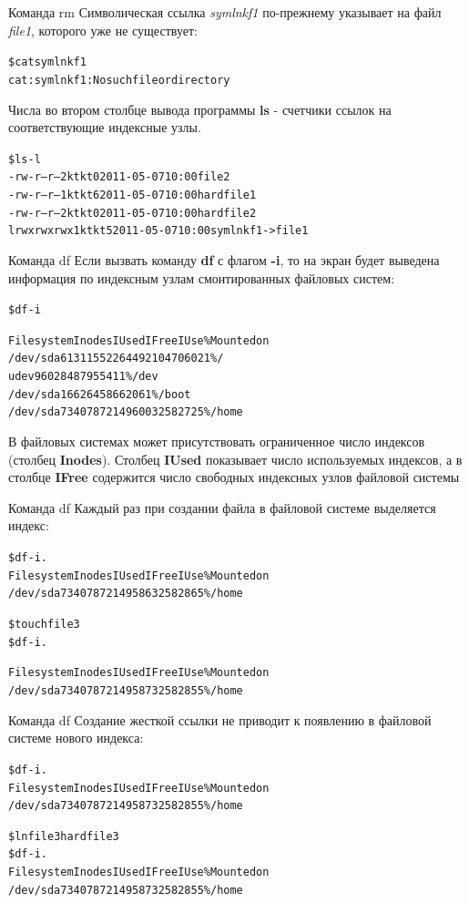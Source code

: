 \documentclass[xcolor=table]{beamer}
\begin{document}
\begin{frame}[fragile]{Команда rm}
	Символическая ссылка \textit{symlnkf1} по-прежнему указывает на файл \textit{file1}, которого уже не существует:
	\begin{alltt}
		\$ cat symlnkf1
		cat: symlnkf1: No such file or directory
	\end{alltt}
	Числа во втором столбце вывода программы \textbf{ls} - счетчики ссылок на соответствующие индексные узлы.
	\begin{alltt}
		\$ ls -l
		-rw-r--r-- 2 kt kt 0 2011-05-07 10:00 file2
		-rw-r--r-- 1 kt kt 6 2011-05-07 10:00 hardfile1
		-rw-r--r-- 2 kt kt 0 2011-05-07 10:00 hardfile2
		lrwxrwxrwx 1 kt kt 5 2011-05-07 10:00 symlnkf1 -> file1
	\end{alltt}
\end{frame}

\begin{frame}[fragile]{Команда df}
	Если вызвать команду \textbf{df} с флагом \textbf{-i}, то на экран будет выведена информация по индексным узлам смонтированных файловых систем:
	\begin{alltt}
		\$ df -i

		Filesystem Inodes IUsed IFree IUse\% Mounted on
		/dev/sda6 1311552 264492 1047060 21\% /
		udev 96028 487 95541 1\% /dev
		/dev/sda1 66264 58 66206 1\% /boot
		/dev/sda7 3407872 149600 3258272 5\% /home
	\end{alltt}
	В файловых системах может присутствовать ограниченное число индексов (столбец \textbf{Inodes}). Столбец \textbf{IUsed} показывает число используемых индексов, а в столбце \textbf{IFree} содержится число свободных индексных узлов файловой системы
\end{frame}

\begin{frame}[fragile]{Команда df}
	Каждый раз при создании файла в файловой системе выделяется индекс:
	\begin{alltt}
		\$ df -i .
		Filesystem Inodes IUsed IFree IUse\% Mounted on
		/dev/sda7 3407872 149586 3258286 5\% /home

		\$ touch file3
		\$ df -i .

		Filesystem Inodes IUsed IFree IUse\% Mounted on
		/dev/sda7 3407872 149587 3258285 5\% /home
	\end{alltt}
\end{frame}

\begin{frame}[fragile]{Команда df}
	Создание жесткой ссылки не приводит к появлению в файловой системе нового индекса:
	\begin{alltt}
		\$ df -i .
		Filesystem Inodes IUsed IFree IUse\% Mounted on
		/dev/sda7 3407872 149587 3258285 5\% /home

		\$ ln file3 hardfile3
		\$ df -i .
		Filesystem Inodes IUsed IFree IUse\% Mounted on
		/dev/sda7 3407872 149587 3258285 5\% /home
	\end{alltt}
\end{frame}
\end{document}
